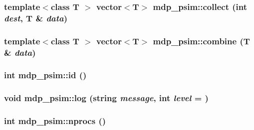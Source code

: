 \label{classmdp__psim_a5bc9df8615a06e02b78114ac10e9b5dd}
\hypertarget{classmdp__psim_a8efbb5617c3e3420dbf65bc245a0a5b5}{
\subsubsection[{collect}]{\setlength{\rightskip}{0pt plus 5cm}template$<$class T $>$ vector$<$T$>$ mdp\_\-psim::collect (int {\em dest}, \/  T \& {\em data})}}
\label{classmdp__psim_a8efbb5617c3e3420dbf65bc245a0a5b5}
\hypertarget{classmdp__psim_a8fb8fc943240328daedc8fade15fed9a}{
\subsubsection[{combine}]{\setlength{\rightskip}{0pt plus 5cm}template$<$class T $>$ vector$<$T$>$ mdp\_\-psim::combine (T \& {\em data})}}
\label{classmdp__psim_a8fb8fc943240328daedc8fade15fed9a}
\hypertarget{classmdp__psim_add120eb0aa77a4b73d0844eda58b0570}{
\subsubsection[{id}]{\setlength{\rightskip}{0pt plus 5cm}int mdp\_\-psim::id ()}}
\label{classmdp__psim_add120eb0aa77a4b73d0844eda58b0570}
\hypertarget{classmdp__psim_ab3b24379c623c72635210d348399414e}{
\subsubsection[{log}]{\setlength{\rightskip}{0pt plus 5cm}void mdp\_\-psim::log (string {\em message}, \/  int {\em level} = {})}}
\label{classmdp__psim_ab3b24379c623c72635210d348399414e}
\hypertarget{classmdp__psim_a6377b54cc52e570452c048e5a97b8030}{
\subsubsection[{nprocs}]{\setlength{\rightskip}{0pt plus 5cm}int mdp\_\-psim::nprocs ()}}
